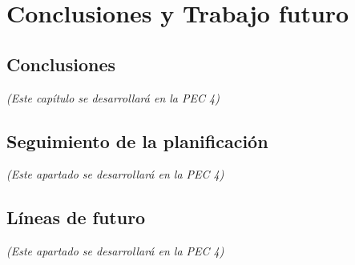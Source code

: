 \clearpage
\section{Conclusiones y Trabajo futuro}

\subsection{Conclusiones}

\textit{(Este capítulo se desarrollará en la PEC 4)}

\subsection{Seguimiento de la planificación}

\textit{(Este apartado se desarrollará en la PEC 4)}

\subsection{Líneas de futuro}

\textit{(Este apartado se desarrollará en la PEC 4)}

